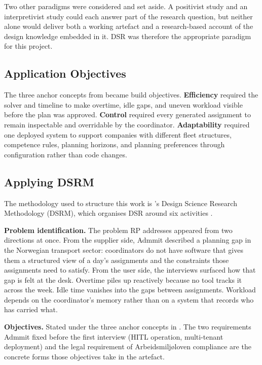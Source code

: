Two other paradigms were considered and set aside. A positivist study and an interpretivist study could each answer part of the research question, but neither alone would deliver both a working artefact and a research-based account of the design knowledge embedded in it. DSR was therefore the appropriate paradigm for this project.

\subsection{Application Objectives}
\label{sec:application-objectives}

The three anchor concepts from  became build objectives. \textbf{Efficiency} required the solver and timeline to make overtime, idle gaps, and uneven workload visible before the plan was approved. \textbf{Control} required every generated assignment to remain inspectable and overridable by the coordinator. \textbf{Adaptability} required one deployed system to support companies with different fleet structures, competence rules, planning horizons, and planning preferences through configuration rather than code changes.

\subsection{Applying DSRM}
\label{sec:dsrm-applied}

The methodology used to structure this work is \textcite{peffers2007dsrm}'s Design Science Research Methodology (DSRM), which organises DSR around six activities \parencite[p.~46]{peffers2007dsrm}.

\textbf{Problem identification.} The problem RP addresses appeared from two directions at once. From the supplier side, Admmit described a planning gap in the Norwegian transport sector: coordinators do not have software that gives them a structured view of a day's assignments and the constraints those assignments need to satisfy. From the user side, the interviews surfaced how that gap is felt at the desk. Overtime piles up reactively because no tool tracks it across the week. Idle time vanishes into the gaps between assignments. Workload depends on the coordinator's memory rather than on a system that records who has carried what.

\textbf{Objectives.} Stated under the three anchor concepts in . The two requirements Admmit fixed before the first interview (HITL operation, multi-tenant deployment) and the legal requirement of Arbeidsmiljøloven compliance are the concrete forms those objectives take in the artefact.

